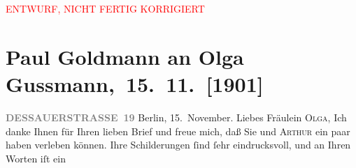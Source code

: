 
\begin{center}
            \textcolor{red}{ENTWURF, NICHT FERTIG KORRIGIERT}
                      \end{center}
            
         
         \renewcommand{\erwaehntePersonen}{Personen: Gerhart Hauptmann, Olga Schnitzler, Elisabeth Steinrück}
         \renewcommand{\erwaehnteOrte}{Orte: Berlin, Dessauer Straße, Hotel Edlacherhof, Wien}
         \renewcommand{\erwaehnteWerke}{Werke: Berliner Brief. [»Schluck und Jau« von Gerhart Hauptmann am Deutschen Theater], Berliner Theater. »Einsame Menschen« im Deutschen Theater, Einsame Menschen. Drama, Neue Freie Presse, »Michael Kramer.«}
               \section[ Paul Goldmann an Olga Gussmann, 15. 11. {[}1901{]}]{ Paul Goldmann an Olga Gussmann, 15. 11. {[}1901{]}}\nopagebreak{}\rehead{ }\begin{ledgroupsized}[t]{13cm}\normalsize\beginnumbering \toendnotes[C]{\smallbreak\pagebreak[2]} 
\toendnotes[C]{\smallbreak}\pstart
           \noindent{}\raggedleft{}{\pb}\textcolor{gray}{\textbf{DESSAUERSTRASSE 19}}\pend
           \pstart
           Berlin, 15. November.\pend
           \pstart{}Liebes Fräulein \textsc{Olga},\pend\pstart
           Ich danke Ihnen für Ihren lieben Brief und freue mich, daß Sie und \textsc{Arthur} ein paar \label{K_L03535-1v}\label{K_L03535-1h} haben verleben
               können. Ihre Schilderungen ſind ſehr eindrucksvoll, und an Ihren Worten iſt ein

\end{ledgroupsized}
